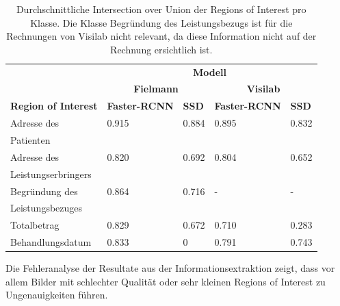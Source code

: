 \begin{table}[h!]
    \centering
    \captionsetup{width=.9\linewidth}
    \caption[Durchschnittliche Intersection over Union der Regions of Interest pro Klasse]{Durchschnittliche Intersection over Union der Regions of Interest pro Klasse. Die Klasse Begründung des Leistungsbezugs ist für die Rechnungen von Visilab nicht relevant, da diese Information nicht auf der Rechnung ersichtlich ist.}
    \label{tab:specific-ie-iou}
    \begin{tabular}{|l|l|l|l|l|}
    \hhline{~|----|}    
    \multicolumn{1}{c|}{}
                                    & \multicolumn{4}{c|}{\cellcolor[HTML]{DDDDDD}\textbf{Modell}}  \\
    \hhline{~|--|--|}
    \multicolumn{1}{c|}{}
                                    & \multicolumn{2}{c|}{\cellcolor[HTML]{DDDDDD}\textbf{Fielmann}} 
                                                            & \multicolumn{2}{c|}{\cellcolor[HTML]{DDDDDD}\textbf{Visilab}} \\
    \hline
    \rowcolor[HTML]{DDDDDD}     
    \textbf{Region of Interest}     & \textbf{Faster-RCNN}  & \textbf{SSD}        & \textbf{Faster-RCNN}  & \textbf{SSD} \\
    \hline
    Adresse des                     & 0.915    & 0.884      & 0.895 & 0.832 \\
    Patienten &&&& \\
    \hline
    Adresse des                     & 0.820    & 0.692      & 0.804 & 0.652 \\
    Leistungserbringers &&&& \\
    \hline
    Begründung des                  & 0.864    & 0.716      & - & - \\
    Leistungsbezuges &&&& \\
    \hline
    Totalbetrag                     & 0.829    & 0.672      & 0.710 & 0.283 \\
    \hline
    Behandlungsdatum                & 0.833    & 0          & 0.791 & 0.743 \\
    \hline
    \end{tabular}
\end{table}

Die Fehleranalyse der Resultate aus der Informationsextraktion zeigt, dass vor allem Bilder mit schlechter Qualität oder sehr kleinen Regions of Interest zu Ungenauigkeiten führen.

